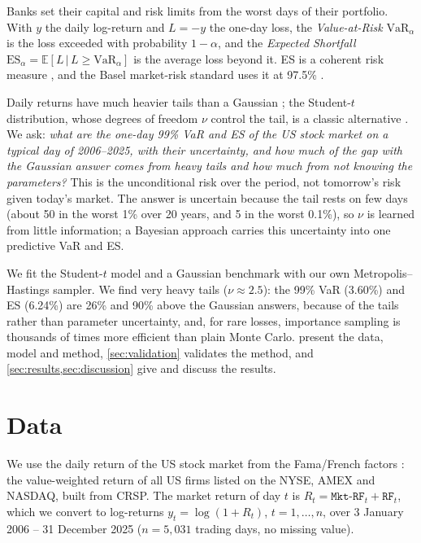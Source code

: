 \documentclass[12pt]{article}
\newcommand{\E}{\mathbb{E}}
\newcommand{\given}{\,\vert\,}
\newcommand{\VaR}{\mathrm{VaR}}
\newcommand{\ES}{\mathrm{ES}}
\begin{document}
Banks set their capital and risk limits from the worst days of their portfolio. With $y$ the daily log-return and $L = -y$ the one-day loss, the \emph{Value-at-Risk} $\VaR_\alpha$ is the loss exceeded with probability $1-\alpha$, and the \emph{Expected Shortfall} $\ES_\alpha = \E[L \given L \ge \VaR_\alpha]$ is the average loss beyond it. ES is a coherent risk measure \cite{artzner1999coherent}, and the Basel market-risk standard uses it at 97.5\% \cite{bcbs2019market}.

Daily returns have much heavier tails than a Gaussian \cite{mandelbrot1963variation}; the Student-$t$ distribution, whose degrees of freedom $\nu$ control the tail, is a classic alternative \cite{praetz1972distribution,blattberg1974comparison}. We ask: \emph{what are the one-day 99\% VaR and ES of the US stock market on a typical day of 2006--2025, with their uncertainty, and how much of the gap with the Gaussian answer comes from heavy tails and how much from not knowing the parameters?} This is the unconditional risk over the period, not tomorrow's risk given today's market. The answer is uncertain because the tail rests on few days (about 50 in the worst 1\% over 20 years, and 5 in the worst 0.1\%), so $\nu$ is learned from little information; a Bayesian approach carries this uncertainty into one predictive VaR and ES.

We fit the Student-$t$ model and a Gaussian benchmark with our own Metropolis--Hastings sampler. We find very heavy tails ($\nu \approx 2.5$): the 99\% VaR (3.60\%) and ES (6.24\%) are 26\% and 90\% above the Gaussian answers, because of the tails rather than parameter uncertainty, and, for rare losses, importance sampling is thousands of times more efficient than plain Monte Carlo.  present the data, model and method, \cref{sec:validation} validates the method, and \cref{sec:results,sec:discussion} give and discuss the results.

\section{Data}\label{sec:data}

We use the daily return of the US stock market from the Fama/French factors \cite{french2026library,fama1993common}: the value-weighted return of all US firms listed on the NYSE, AMEX and NASDAQ, built from CRSP. The market return of day $t$ is $R_t = \texttt{Mkt-RF}_t + \texttt{RF}_t$, which we convert to log-returns $y_t = \log(1 + R_t)$, $t = 1,\dots,n$, over 3 January 2006 -- 31 December 2025 ($n = 5{,}031$ trading days, no missing value).
\end{document}
